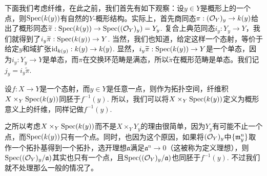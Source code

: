 下面我们考虑纤维，在此之前，我们首先有如下观察：设$y\in Y$是概形上的一个点，则$\operatorname{Spec} (k(y))$有自然的$Y$-概形结构。实际上，首先商同态$\pi:(\mathcal{O}_{Y})_y\to k(y)$给出了概形同态$\widetilde{\pi}:\operatorname{Spec}(k(y))\to \operatorname{Spec} ((\mathcal{O}_{Y})_y)=Y_y$. 复合上典范同态$i_y:Y_y\to Y$，我们就得到了$i_y\widetilde{\pi}:\operatorname{Spec}(k(y))\to Y$. 当然，我们也知道，给定这样一个态射，等价于给定$y$和域扩张$\operatorname{id}_{k(y)}:k(y)\to k(y)$. 显然，$i_y\widetilde{\pi}:\operatorname{Spec}(k(y))\to Y$是一个单态，因为$i_y:Y_y\to Y$是单态，而$\pi$在交换环范畴是满态，所以$\widetilde{\pi}$在概形范畴是单态。我们记$j_y=i_y\widetilde{\pi}$.

\begin{pro}[纤维]
设$f:X\to Y$是一个态射，而$y\in Y$是任意一点，则作为拓扑空间，纤维积$X\times_Y\operatorname{Spec} (k(y))$同胚于$f^{-1}(y)$. 所以，我们可以将$X\times_Y\operatorname{Spec} (k(y))$定义为概形意义上的纤维，同样记做$f^{-1}(y)$.
\end{pro}

之所以考虑$X\times_Y\operatorname{Spec} (k(y))$而不是$X\times_Y Y_y$的理由很简单，因为$Y_y$有可能不止一个点，而$\operatorname{Spec} (k(y))$只有一个点。同时，也因为这个原因，如果将$(\mathcal{O}_Y)_y$中$\{\mathfrak{m}_y^n\}$取作一个拓扑基得到一个拓扑，选开理想$\mathfrak{a}$满足$\mathfrak{a}^n\to 0$（这被称为定义理想），则$\operatorname{Spec}((\mathcal{O}_Y)_y/\mathfrak{a})$其实也只有一个点，且$\operatorname{Spec}((\mathcal{O}_Y)_y/\mathfrak{a})$也同胚于$f^{-1}(y)$. 不过我们就不处理那么一般的情况了。

